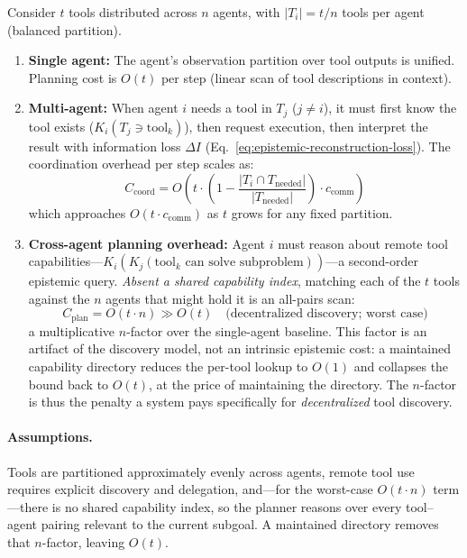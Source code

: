 \begin{theorem}
\label{thm:tool-density}
Consider $t$ tools distributed across $n$ agents, with $|T_i| = t/n$ tools per agent (balanced partition).
\begin{enumerate}[leftmargin=*]
\item[(a)] \textbf{Single agent:} The agent's observation partition over tool outputs is unified. Planning cost is $O(t)$ per step (linear scan of tool descriptions in context).
\item[(b)] \textbf{Multi-agent:} When agent $i$ needs a tool in $T_j$ ($j \ne i$), it must first know the tool exists ($K_i(T_j \ni \mathrm{tool}_k)$), then request execution, then interpret the result with information loss $\Delta I$ (Eq.~\eqref{eq:epistemic-reconstruction-loss}). The coordination overhead per step scales as:
\begin{equation}
C_{\mathrm{coord}} = O\!\left(t \cdot \left(1 - \frac{|T_i \cap T_{\mathrm{needed}}|}{|T_{\mathrm{needed}}|}\right) \cdot c_{\mathrm{comm}}\right)
\label{eq:tool-coord-overhead}
\end{equation}
which approaches $O(t \cdot c_{\mathrm{comm}})$ as $t$ grows for any fixed partition.
\item[(c)] \textbf{Cross-agent planning overhead:} Agent $i$ must reason about remote tool capabilities---$K_i(K_j(\mathrm{tool}_k \text{ can solve subproblem}))$---a second-order epistemic query. \emph{Absent a shared capability index}, matching each of the $t$ tools against the $n$ agents that might hold it is an all-pairs scan:
\begin{equation}
C_{\mathrm{plan}} = O(t \cdot n) \gg O(t) \quad\text{(decentralized discovery; worst case)}
\label{eq:tool-planning-cost}
\end{equation}
a multiplicative $n$-factor over the single-agent baseline. This factor is an artifact of the discovery model, not an intrinsic epistemic cost: a maintained capability directory reduces the per-tool lookup to $O(1)$ and collapses the bound back to $O(t)$, at the price of maintaining the directory. The $n$-factor is thus the penalty a system pays specifically for \emph{decentralized} tool discovery.
\end{enumerate}
\end{theorem}

\paragraph{Assumptions.}
Tools are partitioned approximately evenly across agents, remote tool use requires explicit discovery and delegation, and---for the worst-case $O(t \cdot n)$ term---there is no shared capability index, so the planner reasons over every tool--agent pairing relevant to the current subgoal. A maintained directory removes that $n$-factor, leaving $O(t)$.

